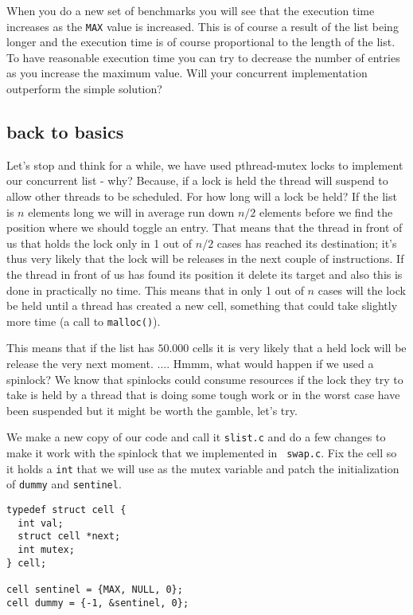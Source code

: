 \documentclass[a4paper,11pt]{article}
\begin{document}
When you do a new set of benchmarks you will see that the execution
time increases as the {\tt MAX} value is increased. This is of course
a result of the list being longer and the execution time is of course
proportional to the length of the list. To have reasonable execution
time you can try to decrease the number of entries as you increase the
maximum value. Will your concurrent implementation outperform the
simple solution?

\subsection{back to basics}

Let's stop and think for a while, we have used pthread-mutex locks to
implement our concurrent list - why? Because, if a lock is held the
thread will suspend to allow other threads to be scheduled. For how
long will a lock be held? If the list is $n$ elements long we will in
average run down $n/2$ elements before we find the position where we
should toggle an entry. That means that the thread in front of us that
holds the lock only in 1 out of $n/2$ cases has reached its
destination; it's thus very likely that the lock will be releases in
the next couple of instructions. If the thread in front of us has
found its position it delete its target and also this is done in
practically no time. This means that in only 1 out of $n$ cases will
the lock be held until a thread has created a new cell, something that
could take slightly more time (a call to {\tt malloc()}).

This means that if the list has $50.000$ cells it is very likely that
a held lock will be release the very next moment. .... Hmmm, what
would happen if we used a spinlock? We know that spinlocks could
consume resources if the lock they try to take is held by a thread
that is doing some tough work or in the worst case have been suspended
but it might be worth the gamble, let's try.

We make a new copy of our code and call it {\tt slist.c} and do a few
changes to make it work with the spinlock that we implemented in {\tt
  swap.c}. Fix the cell so it holds a {\tt int} that we will use as
the mutex variable and patch the initialization of {\tt dummy} and {\tt sentinel}.

\begin{lstlisting}
typedef struct cell {
  int val;
  struct cell *next;
  int mutex;
} cell;
  
cell sentinel = {MAX, NULL, 0};
cell dummy = {-1, &sentinel, 0};
\end{lstlisting}
\end{document}
